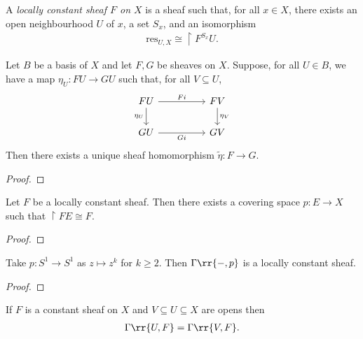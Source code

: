 \documentclass{article}
\begin{document}
\begin{definition}
  A \emph{locally constant sheaf $F$ on $X$} is a sheaf such that,
  for all $x\in X$, there exists an open neighbourhood $U$ of $x$,
  a set $S_x$, and an isomorphism
  \begin{align*}
    \text{res}_{U,X} \cong \restriction{F^{S_x}}{U}.
  \end{align*}
\end{definition}

\begin{lemma}
  Let $B$ be a basis of $X$ and let $F,G$ be sheaves on $X$. Suppose, for all $U\in B$,
  we have a map $\eta_U:FU\to GU$ such that, for all $V\subseteq U$,
  \begin{equation}
    \begin{tikzcd}
      FU && FV \\
      GU && GV
      \arrow["Fi", from=1-1, to=1-3]
      \arrow["{\eta_U}"', from=1-1, to=2-1]
      \arrow["{\eta_V}", from=1-3, to=2-3]
      \arrow["Gi"', from=2-1, to=2-3]
    \end{tikzcd}
  \end{equation}
  Then there exists a unique sheaf homomorphism $\tilde\eta : F\to G$.
  \begin{proof}
    \missingproof
  \end{proof}
\end{lemma}

\begin{theorem}
  Let $F$ be a locally constant sheaf. Then there exists a covering space
  $p:E\to X$ such that $\restriction{F}{E} \cong F$.
  \begin{proof}
    \missingproof
  \end{proof}
\end{theorem}

\begin{example}
  Take $p:S^1 \to S^1$ as $z\mapsto z^k$ for $k\geq 2$.
  Then $\Gamma\rr{-,p}$ is a locally constant sheaf.
  \begin{proof}
    \missingproof
  \end{proof}
\end{example}

\begin{lemma}
  If $F$ is a constant sheaf on $X$ and $V\subseteq U\subseteq X$ are opens then
  \begin{align*}
    \Gamma\rr{U, F} = \Gamma\rr{V,F}.
  \end{align*}
\end{lemma}
\end{document}
